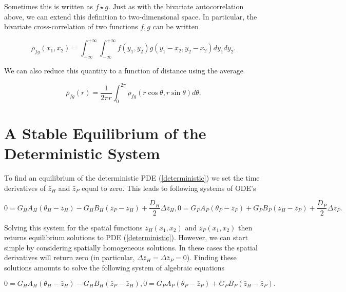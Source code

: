 \documentclass{article}
\begin{document}
Sometimes this is written as \(f\star g\). Just as with the bivariate
autocorrelation above, we can extend this definition to two-dimensional
space. In particular, the bivariate cross-correlation of two functions
\(f,g\) can be written

\begin{equation}
  \rho_{fg}(x_1,x_2)=\int_{-\infty}^{+\infty}\int_{-\infty}^{+\infty}f(y_1,y_2)g(y_1-x_2,y_2-x_2)dy_1dy_2.
\end{equation}

We can also reduce this quantity to a function of distance using the
average

\begin{equation}
  \bar\rho_{fg}(r)=\frac{1}{2\pi r}\int_0^{2\pi}\rho_{fg}(r\cos\theta,r\sin\theta)d\theta.
\end{equation}

\hypertarget{a-stable-equilibrium-of-the-deterministic-system}{%
\section{A Stable Equilibrium of the Deterministic
System}\label{a-stable-equilibrium-of-the-deterministic-system}}

To find an equilibrium of the deterministic PDE (\ref{deterministic}) we
set the time derivatives of \(\bar z_H\) and \(\bar z_P\) equal to zero.
This leads to following systems of ODE's

\begin{subequations}
  \begin{equation}
    0=G_HA_H(\theta_H-\bar z_H)-G_HB_H(\bar z_P-\bar z_H)+\frac{D_H}{2}\Delta\bar z_H,
  \end{equation}
  \begin{equation}
    0=G_PA_P(\theta_P-\bar z_P)+G_PB_P(\bar z_H-\bar z_P)+\frac{D_P}{2}\Delta\bar z_P.
  \end{equation}
\end{subequations}

Solving this system for the spatial functions \(\bar z_H(x_1,x_2)\) and
\(\bar z_P(x_1,x_2)\) then returns equilibrium solutions to PDE
(\ref{deterministic}). However, we can start simple by considering
spatially homogeneous solutions. In these cases the spatial derivatives
will return zero (in particular, \(\Delta\bar z_H=\Delta\bar z_P=0\)).
Finding these solutions amounts to solve the following system of
algebraic equations

\begin{subequations}
  \begin{equation}
    0=G_HA_H(\theta_H-\bar z_H)-G_HB_H(\bar z_P-\bar z_H),
  \end{equation}
  \begin{equation}
    0=G_PA_P(\theta_P-\bar z_P)+G_PB_P(\bar z_H-\bar z_P).
  \end{equation}
\end{subequations}
\end{document}
